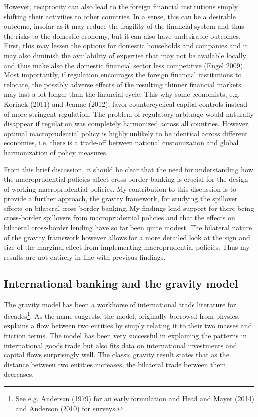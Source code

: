 \documentclass[12pt,a4paper]{article}
\begin{document}
However, reciprocity can also lead to the foreign financial institutions simply shifting their activities to other countries. In a sense, this can be a desirable outcome, insofar as it may reduce the fragility of the financial system and thus the risks to the domestic economy, but it can also have undesirable outcomes. First, this may lessen the options for domestic households and companies and it may also diminish the availability of expertise that may not be available locally and thus make also the domestic financial sector less competitive (Engel 2009). Most importantly, if regulation encourages the foreign financial institutions to relocate, the possibly adverse effects of the resulting thinner financial markets may last a lot longer than the financial cycle. This why some economists, e.g. Korinek (2011) and Jeanne (2012), favor countercyclical capital controls instead of more stringent regulation. The problem of regulatory arbitrage would naturally disappear if regulation was completely harmonized across all countries. However, optimal macroprudential policy is highly unlikely to be identical across different economies, i.e. there is a trade-off between national customization and global harmonization of policy measures. 

From this brief discussion, it should be clear that the need for understanding how the macroprudential policies affect cross-border banking is crucial for the design of working macroprudential policies. My contribution to this discussion is to provide a further approach, the gravity framework, for studying the spillover effects on bilateral cross-border banking. My findings lend support for there being cross-border spillovers from macroprudential policies and that the effects on bilateral cross-border lending have so far been quite modest. The bilateral nature of the gravity framework however allows for a more detailed look at the sign and size of the marginal effect from implementing macroprudential policies. Thus my results are not entirely in line with previous findings. 

\subsection{International banking and the gravity model}

The gravity model has been a workhorse of international trade literature for decades\footnote{See e.g. Anderson (1979) for an early formulation and Head and Mayer (2014) and Anderson (2010) for surveys.}. As the name suggests, the model, originally borrowed from physics, explains a flow between two entities by simply relating it to their two masses and friction terms. The model has been very successful in explaining the patterns in international goods trade but also fits data on international investments and capital flows surprisingly well. The classic gravity result states that as the distance between two entities increases, the bilateral trade between them decreases. 
\end{document}
